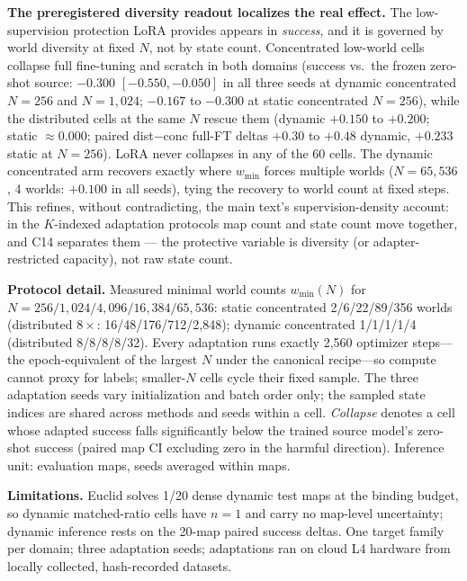 \documentclass[letterpaper]{article} %
\begin{document}
\textbf{The preregistered diversity readout localizes the real effect.} The low-supervision protection LoRA provides appears in \emph{success}, and it is governed by world diversity at fixed $N$, not by state count. Concentrated low-world cells collapse full fine-tuning and scratch in both domains (success vs.\ the frozen zero-shot source: $-0.300$ $[-0.550,-0.050]$ in all three seeds at dynamic concentrated $N{=}256$ and $N{=}1{,}024$; $-0.167$ to $-0.300$ at static concentrated $N{=}256$), while the distributed cells at the same $N$ rescue them (dynamic $+0.150$ to $+0.200$; static $\approx 0.000$; paired dist$-$conc full-FT deltas $+0.30$ to $+0.48$ dynamic, $+0.233$ static at $N{=}256$). LoRA never collapses in any of the 60 cells. The dynamic concentrated arm recovers exactly where $w_{\min}$ forces multiple worlds ($N{=}65{,}536$, 4 worlds: $+0.100$ in all seeds), tying the recovery to world count at fixed steps. This refines, without contradicting, the main text's supervision-density account: in the $K$-indexed adaptation protocols map count and state count move together, and C14 separates them --- the protective variable is diversity (or adapter-restricted capacity), not raw state count.

\textbf{Protocol detail.} Measured minimal world counts $w_{\min}(N)$ for $N{=}256/1{,}024/4{,}096/16{,}384/65{,}536$: static concentrated 2/6/22/89/356 worlds (distributed $8\times$: 16/48/176/712/2{,}848); dynamic concentrated 1/1/1/1/4 (distributed 8/8/8/8/32). Every adaptation runs exactly 2{,}560 optimizer steps---the epoch-equivalent of the largest $N$ under the canonical recipe---so compute cannot proxy for labels; smaller-$N$ cells cycle their fixed sample. The three adaptation seeds vary initialization and batch order only; the sampled state indices are shared across methods and seeds within a cell. \emph{Collapse} denotes a cell whose adapted success falls significantly below the trained source model's zero-shot success (paired map CI excluding zero in the harmful direction). Inference unit: evaluation maps, seeds averaged within maps.

\textbf{Limitations.} Euclid solves 1/20 dense dynamic test maps at the binding budget, so dynamic matched-ratio cells have $n{=}1$ and carry no map-level uncertainty; dynamic inference rests on the 20-map paired success deltas. One target family per domain; three adaptation seeds; adaptations ran on cloud L4 hardware from locally collected, hash-recorded datasets.
\end{document}

